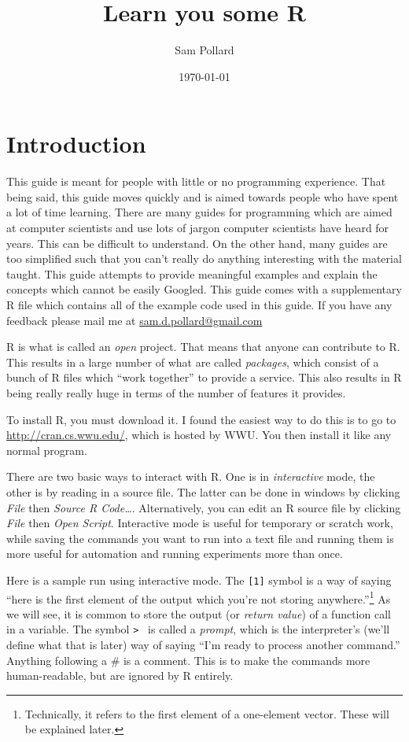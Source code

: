 \documentclass[12pt]{article}
\begin{document}
\title{Learn you some R}
\author{Sam Pollard}
\date{\today}
\maketitle

\section{Introduction}

This guide is meant for people with little or no programming experience. That being said, this guide moves quickly and is aimed towards people who have spent a lot of time learning. There are many guides for programming which are aimed at computer scientists and use lots of jargon computer scientists have heard for years. This can be difficult to understand. On the other hand, many guides are too simplified such that you can't really do anything interesting with the material taught. This guide attempts to provide meaningful examples and explain the concepts which cannot be easily Googled. This guide comes with a supplementary R file which contains all of the example code used in this guide. If you have any feedback please mail me at \url{sam.d.pollard@gmail.com}

R is what is called an \emph{open} project. That means that anyone can contribute to R. This results in a large number of what are called \emph{packages}, which consist of a bunch of R files which ``work together'' to provide a service. This also results in R being really really huge in terms of the number of features it provides.

To install R, you must download it. I found the easiest way to do this is to go to \url{http://cran.cs.wwu.edu/}, which is hosted by WWU. You then install it like any normal program.

There are two basic ways to interact with R. One is in \emph{interactive} mode, the other is by reading in a source file. The latter can be done in windows by clicking \emph{File} then \emph{Source R Code\dots}. Alternatively, you can edit an R source file by clicking \emph{File} then \emph{Open Script}. Interactive mode is useful for temporary or scratch work, while saving the commands you want to run into a text file and running them is more useful for automation and running experiments more than once.

Here is a sample run using interactive mode. The \verb|[1]| symbol is a way of saying ``here is the first element of the output which you're not storing anywhere.''\footnote{Technically, it refers to the first element of a one-element vector. These will be explained later.} As we will see, it is common to store the output (or \emph{return value}) of a function call in a variable. The symbol \verb|> | is called a \emph{prompt}, which is the interpreter's (we'll define what that is later) way of saying ``I'm ready to process another command.'' Anything following a \# is a comment. This is to make the commands more human-readable, but are ignored by R entirely.
\end{document}
